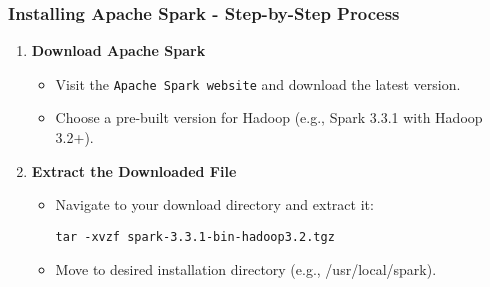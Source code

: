 \documentclass{beamer}
\begin{document}
\begin{frame}[fragile]
    \frametitle{Installing Apache Spark - Step-by-Step Process}
    \begin{enumerate}
        \item \textbf{Download Apache Spark}
        \begin{itemize}
            \item Visit the \texttt{Apache Spark website} and download the latest version.
            \item Choose a pre-built version for Hadoop (e.g., Spark 3.3.1 with Hadoop 3.2+).
        \end{itemize}
        
        \item \textbf{Extract the Downloaded File}
        \begin{itemize}
            \item Navigate to your download directory and extract it:
            \begin{lstlisting}
tar -xvzf spark-3.3.1-bin-hadoop3.2.tgz
            \end{lstlisting}
            \item Move to desired installation directory (e.g., /usr/local/spark).
        \end{itemize}
    \end{enumerate}
\end{frame}
\end{document}
